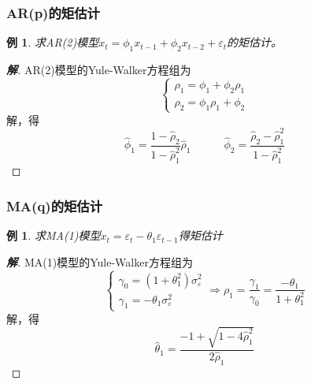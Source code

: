 \documentclass[12pt, a4paper, oneside]{ctexbook}
\newtheorem{example}[theorem]{例}
\newcommand\jie[2]{\begin{proof}[\textbf{#1}]
    #2
\end{proof}}
\begin{document}
\subsubsection{AR(p)的矩估计}
\begin{example}
    求AR(2)模型$x_t = \phi_1 x_{t-1} + \phi_2 x_{t-2} + \varepsilon_t$的矩估计。
\end{example}
\jie{解}{
    AR(2)模型的Yule-Walker方程组为
    \begin{equation*}
        \begin{cases}
            \rho_1=\phi_1+\phi_2\rho_1 \\
            \rho_2=\phi_1\rho_1+\phi_2
        \end{cases}
    \end{equation*}
    解，得
    \begin{equation*}
        \hat{\phi}_1=\frac{1-\hat{\rho}_2}{1-\hat{\rho}_1^2}\hat{\rho}_1
        \quad\quad\quad\hat{\phi}_2=\frac{\hat{\rho}_2-\hat{\rho}_1^2}{1-\hat{\rho}_1^2}
    \end{equation*}
}

\subsubsection{MA(q)的矩估计}
\begin{example}
    求MA(1)模型$x_t = \varepsilon_t - \theta_1\varepsilon_{t-1}$得矩估计
\end{example}
\jie{解}{
    MA(1)模型的Yule-Walker方程组为
    $$
        \begin{cases}
            \gamma_0=(1+\theta_1^2)\sigma_\varepsilon^2 \\
            \gamma_1=-\theta_1\sigma_\varepsilon^2
        \end{cases}
        \Rightarrow
        \rho_1=\frac{\gamma_1}{\gamma_0}=\frac{-\theta_1}{1+\theta_1^2}
    $$
    解，得
    $$
        \hat{\theta}_1=\frac{-1+\sqrt{1-4\hat{\rho}_1^2}}{2\hat{\rho}_1}
    $$
}
\end{document}
